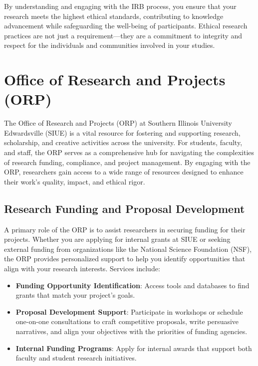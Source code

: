 \documentclass[
]{book}
\providecommand{\tightlist}{%
  \setlength{\itemsep}{0pt}\setlength{\parskip}{0pt}}
\begin{document}
By understanding and engaging with the IRB process, you ensure that your research meets the highest ethical standards, contributing to knowledge advancement while safeguarding the well-being of participants. Ethical research practices are not just a requirement---they are a commitment to integrity and respect for the individuals and communities involved in your studies.

\section{Office of Research and Projects (ORP)}\label{office-of-research-and-projects-orp}

The Office of Research and Projects (ORP) at Southern Illinois University Edwardsville (SIUE) is a vital resource for fostering and supporting research, scholarship, and creative activities across the university. For students, faculty, and staff, the ORP serves as a comprehensive hub for navigating the complexities of research funding, compliance, and project management. By engaging with the ORP, researchers gain access to a wide range of resources designed to enhance their work's quality, impact, and ethical rigor.

\subsection*{Research Funding and Proposal Development}\label{research-funding-and-proposal-development}

A primary role of the ORP is to assist researchers in securing funding for their projects. Whether you are applying for internal grants at SIUE or seeking external funding from organizations like the National Science Foundation (NSF), the ORP provides personalized support to help you identify opportunities that align with your research interests. Services include:

\begin{itemize}
\tightlist
\item
  \textbf{Funding Opportunity Identification}: Access tools and databases to find grants that match your project's goals.
\item
  \textbf{Proposal Development Support}: Participate in workshops or schedule one-on-one consultations to craft competitive proposals, write persuasive narratives, and align your objectives with the priorities of funding agencies.
\item
  \textbf{Internal Funding Programs}: Apply for internal awards that support both faculty and student research initiatives.
\end{itemize}
\end{document}
